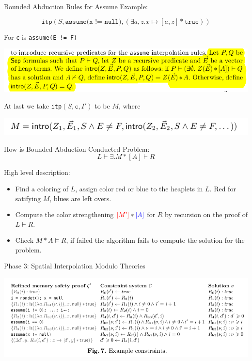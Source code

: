 \documentclass[aspectratio=1610, 13pt]{beamer}
\begin{document}
\begin{frame}{Bounded Abduction Rules for Assume}
Example: 

$$\texttt{itp}(S, \texttt{assume(x != null)}, (\exists a, z. x\mapsto [a, z] \ast \texttt{true}))$$

For \texttt{c} is \texttt{assume(E != F)}

\begin{center}
\includegraphics[scale=0.4]{24.png}
\end{center}
At last we take \texttt{itp}$(S,\texttt{c}, I')$ to be $M$, where
\begin{center}
\includegraphics[scale=0.4]{25.png}
\end{center}
\end{frame}

\begin{frame}{How is Bounded Abduction Conducted}
Problem: 
$$L\vdash \exists. M \ast [A]\vdash R$$

High level description:
\begin{itemize}
\item Find a coloring of $L$, assign color red or blue to the heaplets in $L$. Red for satifying $M$, blues are left overs.
\item Compute the color strengthening $\color{red}[M']\color{black}\ast\color{blue}[A]\color{black}$ for $R$ by \color{orange} recursion on the proof of $L \vdash R$.\color{black}
\item Check $M\ast A \models R$, if failed the algorithm fails to compute the solution for the problem.
\end{itemize}

\end{frame}
\begin{frame}{Phase 3: Spatial Interpolation Modulo Theories}
\begin{center}
\includegraphics[scale=0.4]{26.png}
\end{center}
\end{frame}
\end{document}
